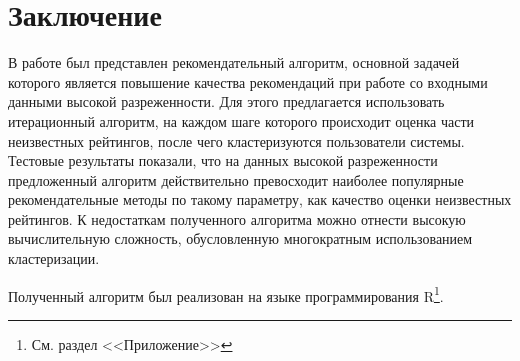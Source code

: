 \documentclass[a4paper, 12pt]{article} %
\begin{document}
	

\section{Заключение}
В работе был представлен рекомендательный алгоритм, основной задачей которого является повышение качества рекомендаций при работе со входными данными высокой разреженности. Для этого предлагается использовать итерационный алгоритм, на каждом шаге которого происходит оценка части неизвестных рейтингов, после чего кластеризуются пользователи системы. Тестовые результаты показали, что на данных высокой разреженности предложенный алгоритм действительно превосходит наиболее популярные рекомендательные методы по такому параметру, как качество оценки неизвестных рейтингов.  
К недостаткам полученного алгоритма можно отнести высокую вычислительную сложность, обусловленную многократным использованием кластеризации.
\par
Полученный алгоритм был реализован на языке программирования R\footnote{См. раздел <<Приложение>>}.

\newpage
\cleardoublepage
\end{document}
